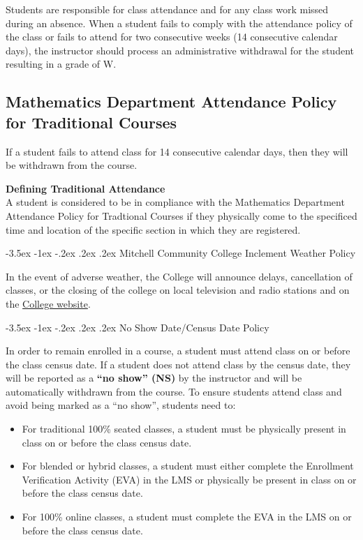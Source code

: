 \documentclass{article}
\makeatletter
\renewcommand\section{\@startsection{section}{1}{0pt}%
  {-3.5ex \@plus -1ex \@minus -.2ex}%
  {.2ex \@plus.2ex}%
  {\normalfont\Large\bfseries}} %
\renewenvironment{framed}[1][]{%
  \def\FrameCommand{%
    \hspace{1pt}%
    {\color{mybordercolor}\vrule width 2pt} %
    \hspace{1pt}%
    \fboxsep=\FrameSep%
    \colorbox{mybgcolor}%
  }%
  \MakeFramed {\advance\hsize-\width \FrameRestore}%
}{%
  \endMakeFramed
}
\makeatother
\begin{document}
Students are responsible for class attendance and for any class work missed during an absence. When a student fails to comply with the attendance policy of the class or fails to attend for two consecutive weeks (14 consecutive calendar days), the instructor should process an administrative withdrawal for the student resulting in a grade of W.

\subsection{Mathematics Department Attendance Policy for Traditional Courses}

If a student fails to attend class for 14 consecutive calendar days, then they will be withdrawn from the course.

\begin{framed}
\textbf{Defining Traditional Attendance}\\
A student is considered to be in compliance with the Mathematics Department Attendance Policy for Tradtional Courses if they physically come to the specificed time and location of the specific section in which they are registered.
\end{framed}

\section{Mitchell Community College Inclement Weather Policy}

In the event of adverse weather, the College will announce delays, cancellation of classes, or the closing of the college on local television and radio stations and on the \href{https://www.mitchellcc.edu}{College website}.

\section{No Show Date/Census Date Policy}

In order to remain enrolled in a course, a student must attend class on or before the class census date. If a student does not attend class by the census date, they will be reported as a \textbf{``no show'' (NS)} by the instructor and will be automatically withdrawn from the course.  To ensure students attend class and avoid being marked as a ``no show'', students need to:

\begin{itemize}
\item For traditional 100\% seated classes, a student must be physically present in class on or before the class census date.


\item For blended or hybrid classes, a student must either complete the Enrollment Verification Activity (EVA) in the LMS or physically be present in class on or before the class census date.


\item For 100\% online classes, a student must complete the EVA in the LMS on or before the class census date.
\end{itemize}
\end{document}
